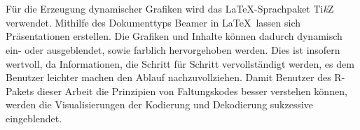 \\
\\
Für die Erzeugung dynamischer Grafiken wird das \LaTeX -Sprachpaket Ti\textit{k}Z verwendet. Mithilfe des Dokumenttyps Beamer in \LaTeX\ lassen sich Präsentationen erstellen. Die Grafiken und Inhalte können dadurch dynamisch ein- oder ausgeblendet, sowie farblich hervorgehoben werden. Dies ist insofern wertvoll, da Informationen, die Schritt für Schritt vervollständigt werden, es dem Benutzer leichter machen den Ablauf nachzuvollziehen. Damit Benutzer des R-Pakets dieser Arbeit die Prinzipien von Faltungskodes besser verstehen können, werden die Visualisierungen der Kodierung und Dekodierung sukzessive eingeblendet.